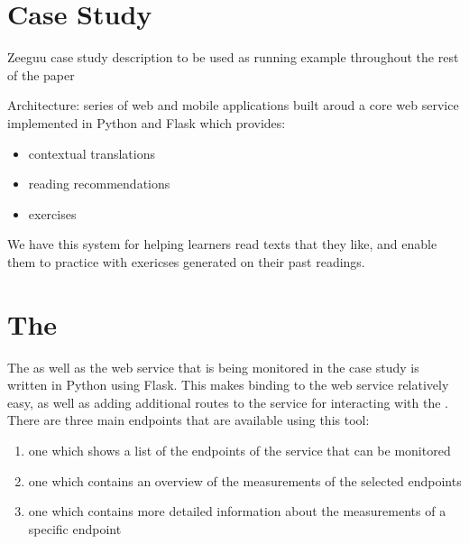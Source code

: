 \documentclass[conference]{IEEEtran}
\begin{document}
\section{Case Study}

Zeeguu case study description to be used as running example throughout the rest of the paper \cite{Lungu16}

Architecture: series of web and mobile applications built aroud a core web service implemented in Python and Flask which provides: 
\begin{itemize}
  \item contextual translations 
  \item reading recommendations
  \item exercises
\end{itemize}

We have this system for helping learners read texts that they like, and enable them to practice with exericses generated on their past readings.


\section{The \tool}

The \tool as well as the web service that is being monitored in the case study is written in Python using Flask. This makes binding to the web service relatively easy, as well as adding additional routes to the service for interacting with the \tool. There are three main endpoints that are available using this tool:
\begin{enumerate}
  \item one which shows a list of the endpoints of the service that can be monitored
  \item one which contains an overview of the measurements of the selected endpoints
  \item one which contains more detailed information about the measurements of a specific endpoint
\end{enumerate}
\end{document}
